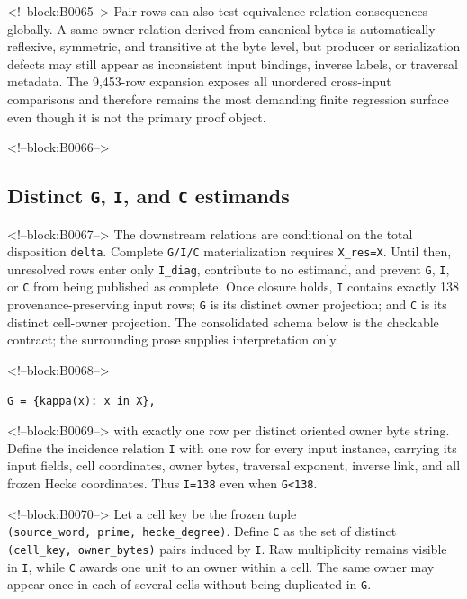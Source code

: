\documentclass[11pt]{article}
\begin{document}
<!--block:B0065-->
Pair rows can also test equivalence-relation consequences globally. A
same-owner relation derived from canonical bytes is automatically
reflexive, symmetric, and transitive at the byte level, but producer or
serialization defects may still appear as inconsistent input bindings,
inverse labels, or traversal metadata. The 9,453-row expansion exposes
all unordered cross-input comparisons and therefore remains the most
demanding finite regression surface even though it is not the primary
proof object.

<!--block:B0066-->
\hypertarget{44-distinct-g-i-and-c-estimands}{%
\subsection{\texorpdfstring{Distinct \texttt{G}, \texttt{I}, and
\texttt{C}
estimands}{Distinct G, I, and C estimands}}\label{44-distinct-g-i-and-c-estimands}}

<!--block:B0067-->
The downstream relations are conditional on the total disposition
\texttt{delta}.  Complete \texttt{G/I/C} materialization requires
\texttt{X\_res=X}.  Until then, unresolved rows enter only
\texttt{I\_diag}, contribute to no estimand, and prevent \texttt{G},
\texttt{I}, or \texttt{C} from being published as complete.  Once closure holds,
\texttt{I} contains exactly 138 provenance-preserving input rows;
\texttt{G} is its distinct owner projection; and \texttt{C} is its distinct
cell-owner projection.  The consolidated schema below is the checkable contract;
the surrounding prose supplies interpretation only.

<!--block:B0068-->
\begin{verbatim}
G = {kappa(x): x in X},
\end{verbatim}

<!--block:B0069-->
with exactly one row per distinct oriented owner byte string. Define the
incidence relation \texttt{I} with one row for every input instance,
carrying its input fields, cell coordinates, owner bytes, traversal
exponent, inverse link, and all frozen Hecke coordinates. Thus
\texttt{\textbar{}I\textbar{}=138} even when
\texttt{\textbar{}G\textbar{}\textless{}138}.

<!--block:B0070-->
Let a cell key be the frozen tuple
\texttt{(source\_word,\ prime,\ hecke\_degree)}. Define \texttt{C} as
the set of distinct \texttt{(cell\_key,\ owner\_bytes)} pairs induced by
\texttt{I}. Raw multiplicity remains visible in \texttt{I}, while
\texttt{C} awards one unit to an owner within a cell. The same owner may
appear once in each of several cells without being duplicated in
\texttt{G}.
\end{document}

